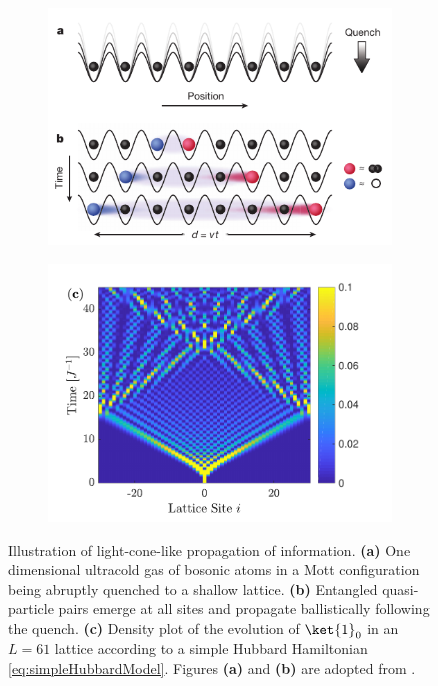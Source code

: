 \begin{figure}[h!]
\centering %
\begin{subfigure}[t]{0.48\textwidth}
	\hspace{-3mm} 
  	\includegraphics[width=1.1\textwidth]{Figures/QuasiParticles.pdf}
\end{subfigure}
\begin{subfigure}[t]{0.48\textwidth} 
  	\includegraphics[width=1.1\textwidth]{Figures/LightConeDemo.pdf}
\end{subfigure}
\caption{Illustration of light-cone-like propagation of information. \textbf{(a)} One dimensional ultracold gas of bosonic atoms in a Mott configuration being abruptly quenched to a shallow lattice. \textbf{(b)} Entangled quasi-particle pairs emerge at all sites and propagate ballistically following the quench. \textbf{(c)} Density plot of the evolution of $\ket{1}_{0}$ in an $L = 61$ lattice according to a simple Hubbard Hamiltonian \eqref{eq:simpleHubbardModel}. Figures \textbf{(a)} and \textbf{(b)} are adopted from \cite{Cheneau2012}.}
\label{fig:LightCone}
\end{figure}

